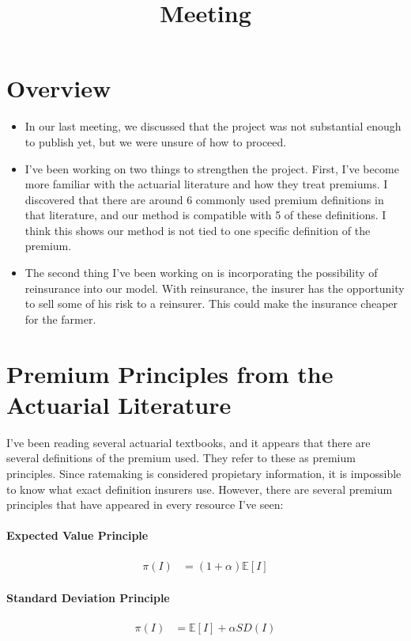 \documentclass[11pt]{article}
\title{Meeting}
\begin{document}
\maketitle
\section{Overview}
  \begin{itemize}
    \item In our last meeting, we discussed that the project was not substantial enough to publish yet, but we were unsure of how to proceed. 
    \item I've been working on two things to strengthen the project. First, I've become more familiar with the actuarial literature and how they treat premiums. I discovered that there are around 6 commonly used premium definitions in that literature, and our method is compatible with 5 of these definitions. I think this shows our method is not tied to one specific definition of the premium. 
    \item The second thing I've been working on is incorporating the possibility of reinsurance into our model. With reinsurance, the insurer has the opportunity to sell some of his risk to a reinsurer. This could make the insurance cheaper for the farmer.  
  \end{itemize}

\section{Premium Principles from the Actuarial Literature}
   I've been reading several actuarial textbooks, and it appears that there are several definitions of the premium used. They refer to these as premium principles. Since ratemaking is considered propietary information, it is impossible to know what exact definition insurers use. However, there are several premium principles that have appeared in every resource I've seen: 

   \paragraph*{Expected Value Principle}
     \begin{align*}
        \pi(I) &= (1 + \alpha)\mathbb{E}[I]
     \end{align*}

  \paragraph*{Standard Deviation Principle}
    \begin{align*}
        \pi(I) &= \mathbb{E}[I] + \alpha SD(I)
    \end{align*}
\end{document}
